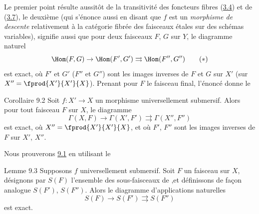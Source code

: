 \documentclass[10pt]{../fichiers-configuration-latex/smfart}
\begin{document}
Le premier point résulte aussitôt de la transitivité des foncteurs
fibres (\hyperref[VIII.subsec3.4]{3.4}) et de (\hyperref[VIII.cor3.7]{3.7}), le deuxième
(qui s'énonce aussi en disant
que $f$ est un \emph{morphisme de descente} relativement à la
catégorie fibrée des faisceaux étales sur des schémas variables),
signifie aussi que pour deux faisceaux $F$, $G$ sur $Y$, le diagramme
naturel
\begin{equation*}
\Hom(F,G)\rightarrow \Hom (F',G')\rightrightarrows \Hom (F'',G'')\tag{$\ast$}
\end{equation*}
est exact, où $F'$ et $G'$ (\resp $F''$ et $G''$) sont les images
inverses de $F$ et $G$ sur $X'$ (\resp sur
$X''=\fprod{X'}{X'}{X}$). Prenant pour $F$ le faisceau final, l'énoncé
donne le

\begin{enonce*}{Corollaire 9.2}
Soit $f:X'\rightarrow X$ un morphisme universellement submersif. Alors
pour tout faisceau $F$ sur $X$, le diagramme
$$
\Gamma(X,F)\rightarrow \Gamma(X',F')\rightrightarrows \Gamma(X'',F'')
$$
est exact, où $X''=\fprod{X'}{X'}{X}$, et où $F'$, $F''$ sont les
images inverses de $F$ sur $X'$, $X''$.
\end{enonce*}

Nous prouverons \hyperref[VIII.prop9.1]{9.1} en utilisant le

\begin{enonce*}{Lemme 9.3}
Supposons $f$ universellement submersif. Soit $F$ un faisceau sur $X$,
désignons par $S(F)$ l'ensemble des sous-faisceaux de ,\pageoriginale  et
définissons de façon analogue $S(F')$, $S(F'')$. Alors le diagramme
d'applications naturelles
$$
S(F)\rightarrow S(F')\rightrightarrows S(F'')
$$
est exact.
\end{enonce*}
\end{document}
